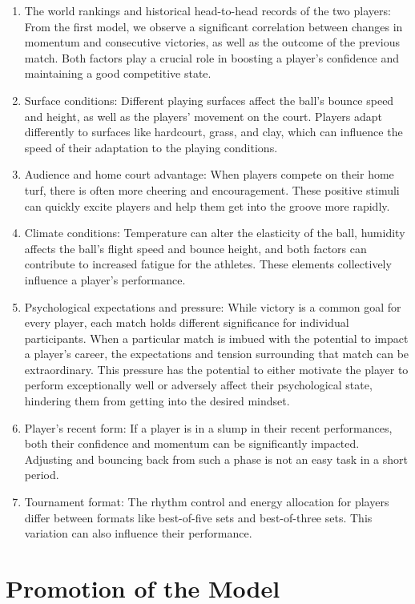 \documentclass[12pt]{article}
\begin{document}
\begin{enumerate}[\bfseries 1.]
	\item The world rankings and historical head-to-head records of the two players: From the first model, we observe a significant correlation between changes in momentum and consecutive victories, as well as the outcome of the previous match. Both factors play a crucial role in boosting a player's confidence and maintaining a good competitive state.
	\item Surface conditions: Different playing surfaces affect the ball's bounce speed and height, as well as the players' movement on the court. Players adapt differently to surfaces like hardcourt, grass, and clay, which can influence the speed of their adaptation to the playing conditions.
	\item Audience and home court advantage: When players compete on their home turf, there is often more cheering and encouragement. These positive stimuli can quickly excite players and help them get into the groove more rapidly.
	\item Climate conditions: Temperature can alter the elasticity of the ball, humidity affects the ball's flight speed and bounce height, and both factors can contribute to increased fatigue for the athletes. These elements collectively influence a player's performance.
	\item Psychological expectations and pressure: While victory is a common goal for every player, each match holds different significance for individual participants. When a particular match is imbued with the potential to impact a player's career, the expectations and tension surrounding that match can be extraordinary. This pressure has the potential to either motivate the player to perform exceptionally well or adversely affect their psychological state, hindering them from getting into the desired mindset.
	\item Player's recent form: If a player is in a slump in their recent performances, both their confidence and momentum can be significantly impacted. Adjusting and bouncing back from such a phase is not an easy task in a short period.
	\item Tournament format: The rhythm control and energy allocation for players differ between formats like best-of-five sets and best-of-three sets. This variation can also influence their performance.
\end {enumerate}	

\section{Promotion of the Model}
\end{document}

